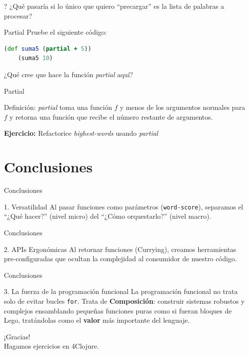 \documentclass{beamer}
\begin{document}
\begin{frame}[fragile]{?}
    ¿Qué pasaría si lo único que quiero ``precargar'' es la lista de palabras a procesar?
\end{frame}

\begin{frame}[fragile]{Partial}
    Pruebe el siguiente código:

    \begin{lstlisting}[language=Clojure]
    (def suma5 (partial + 5))
    (suma5 10)
    \end{lstlisting}

    ¿Qué cree que hace la función \textit{partial} aquí?
\end{frame}


\begin{frame}[fragile]{Partial}
    \begin{block}{Definición:}
        \textit{partial} toma una función $f$ y menos de los argumentos normales para $f$ y retorna una función que recibe el número restante de argumentos.
    \end{block}

    \textbf{Ejercicio:} Refactorice \textit{highest-words} usando \textit{partial}
\end{frame}


\section{Conclusiones}

\begin{frame}{Conclusiones}
    \begin{block}{1. Versatilidad}
        Al pasar funciones como parámetros (\texttt{word-score}), separamos el ``¿Qué hacer?'' (nivel micro) del ``¿Cómo orquestarlo?'' (nivel macro).
    \end{block}
\end{frame}


\begin{frame}{Conclusiones}
    \begin{block}{2. APIs Ergonómicas}
        Al retornar funciones (Currying), creamos herramientas pre-configuradas que ocultan la complejidad al consumidor de nuestro código.
    \end{block}
\end{frame}


\begin{frame}{Conclusiones}
    \begin{block}{3. La fuerza de la programación funcional}
        La programación funcional no trata solo de evitar bucles \texttt{for}. Trata de \textbf{Composición}: construir sistemas robustos y complejos ensamblando pequeñas funciones puras como si fueran bloques de Lego, tratándolas como el \textbf{valor} más importante del lenguaje.
    \end{block}
\end{frame}

\begin{emptyframe}
    ¡Gracias!\\
    \vspace{0.5cm}
    \small {Hagamos ejercicios en 4Clojure.}
\end{emptyframe}
\end{document}
